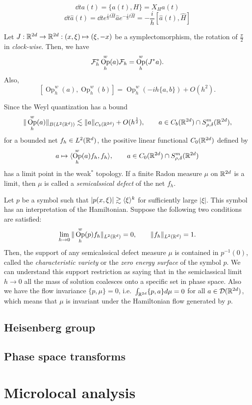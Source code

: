 \documentclass{../../large}
\DeclareMathOperator{\Op}{Op}
\begin{document}
\[\dd{t}a(t)=\{a(t),H\}=X_Ha(t)\]
\[\dd{t}\hat a(t)=\dd{t}e^{\frac iht\hat H}\hat ae^{-\frac iht\hat H}=-\frac ih[\hat a(t),\hat H]\]


Let $J:\mathbb{R}^{2d}\to\mathbb{R}^{2d}:(x,\xi)\mapsto(\xi,-x)$ be a symplectomorphism, the rotation of $\frac\pi2$ in \emph{clock-wise}.
Then, we have
\[\cF_h^*\Op_h^w(a)\cF_h=\Op_h^w(J^*a).\]
Also,
\[[\Op_h^w(a),\Op_h^w(b)]=\Op_h^w(-ih\{a,b\})+O(h^2).\]

Since the Weyl quantization has a bound
\[\|\Op_h^w(a)\|_{B(L^2(\R^d))}\lesssim\|a\|_{C_b(\R^{2d})}+O(h^{\frac12}),\qquad a\in C_b(\R^{2d})\cap S_{\rho,\delta}^m(\R^{2d}),\]
for a bounded net $f_h\in L^2(\mathbb{R}^d)$, the positive linear functional $C_0(\mathbb{R}^{2d})$ defined by
\[a\mapsto\<\Op_h^w(a)f_h,f_h\>,\qquad a\in C_0(\R^{2d})\cap S_{\rho,\delta}^m(\R^{2d})\]
has a limit point in the weak$^*$ topology.
If a finite Radon measure $\mu$ on $\mathbb{R}^{2d}$ is a limit, then $\mu$ is called a \emph{semicalssical defect} of the net $f_h$.

Let $p$ be a symbol such that $|p(x,\xi)|\gtrsim\langle\xi\rangle^k$ for sufficiently large $|\xi|$.
This symbol has an interpretation of the Hamiltonian.
Suppose the following two conditions are satisfied:
\[\lim_{h\to0}\|\Op_h^w(p)f_h\|_{L^2(\R^d)}=0,\qquad\|f_h\|_{L^2(\R^d)}=1.\]
Then, the support of any semicalssical defect measure $\mu$ is contained in $p^{-1}(0)$, called the \emph{characteristic variety} or the \emph{zero energy surface} of the symbol $p$.
We can understand this support restriction as saying that in the semiclassical limit $h\to0$ all the mass of solution coalesces onto a specific set in phase space.
Also we have the flow invariance $\{p,\mu\}=0$, i.e.~$\int_{\mathbb{R}^{2d}}\{p,a\}d\mu=0$ for all $a\in\mathcal{D}(\mathbb{R}^{2d})$, which means that $\mu$ is invariant under the Hamiltonian flow generated by $p$.




\section{Heisenberg group}
\section{Phase space transforms}

\chapter{Microlocal analysis}
\end{document}
